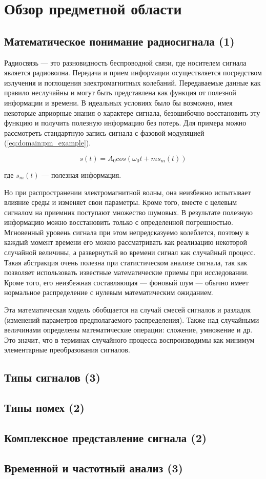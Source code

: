 \section{Обзор предметной области}
\label{sec:domain}

\subsection{Математическое понимание радиосигнала (1)}

Радиосвязь --- это разновидность беспроводной связи, где носителем сигнала является радиоволна. Передача и прием информации осуществляется посредством излучения и поглощения электромагнитных колебаний.
Передаваемые данные как правило неслучайны и могут быть представлена как функция от полезной информации и времени. В идеальных условиях было бы возможно, имея некоторые априорные знания о характере сигнала, безошибочно восстановить эту функцию и получить полезную информацию без потерь. Для примера можно рассмотреть стандартную запись сигнала с фазовой модуляцией (\autoref{eq:domain:pm_example}).

\begin{equation}
  \label{eq:domain:pm_example}
  s(t) = A_0 cos(\omega_0 t + m s_m(t))
\end{equation}
\begin{explanation}
\item[где] $s_m(t)$ --- полезная информация.
\end{explanation}

Но при распространении электромагнитной волны, она неизбежно испытывает влияние среды и изменяет свои параметры. Кроме того, вместе с целевым сигналом на приемник поступают множество шумовых. В результате полезную информацию можно восстановить только с определенной погрешностью.
Мгновенный уровень сигнала при этом непредсказуемо колеблется, поэтому в каждый момент времени его можно рассматривать как реализацию некоторой случайной величины, а развернутый во времени сигнал как случайный процесс. Такая абстракция очень полезна при статистическом анализе сигнала, так как позволяет использовать известные математические приемы при исследовании. Кроме того, его неизбежная составляющая --- фоновый шум --- обычно имеет нормальное распределение с нулевым математическим ожиданием.

Эта математическая модель обобщается на случай смесей сигналов и разладок (изменений параметров предполагаемого распределения). Также над случайными величинами определены математические операции: сложение, умножение и др. Это значит, что в терминах случайного процесса воспроизводимы как минимум элементарные преобразования сигналов.

\subsection{Типы сигналов (3)}
\subsection{Типы помех (2)}
\subsection{Комплексное представление сигнала (2)}
\subsection{Временной и частотный анализ (3)}
